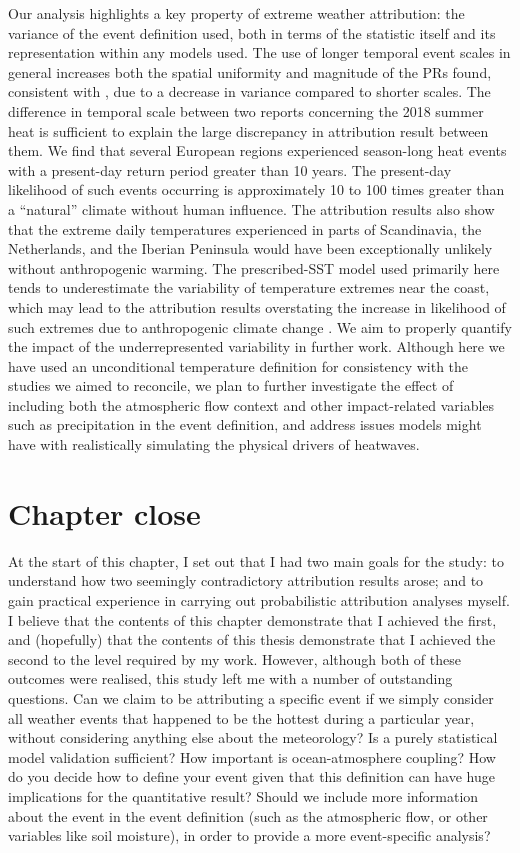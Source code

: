   Our analysis highlights a key property of extreme weather attribution: the variance of the event definition used, both in terms of the statistic itself and its representation within any models used. The use of longer temporal event scales in general increases both the spatial uniformity and magnitude of the PRs found, consistent with \citet{kirchmeieryoung_importance_2019}, due to a decrease in variance compared to shorter scales. The difference in temporal scale between two reports concerning the 2018 summer heat is sufficient to explain the large discrepancy in attribution result between them. We find that several European regions experienced season-long heat events with a present-day return period greater than 10 years. The present-day likelihood of such events occurring is approximately 10 to 100 times greater than a ``natural'' climate without human influence. The attribution results also show that the extreme daily temperatures experienced in parts of Scandinavia, the Netherlands, and the Iberian Peninsula would have been exceptionally unlikely without anthropogenic warming. The prescribed-SST model used primarily here tends to underestimate the variability of temperature extremes near the coast, which may lead to the attribution results overstating the increase in likelihood of such extremes due to anthropogenic climate change \citep{bellprat_towards_2019}. We aim to properly quantify the impact of the underrepresented variability in further work. Although here we have used an unconditional temperature definition for consistency with the studies we aimed to reconcile, we plan to further investigate the effect of including both the atmospheric flow context and other impact-related variables such as precipitation in the event definition, and address issues models might have with realistically simulating the physical drivers of heatwaves.

\section{Chapter close}\label{ch2:close}

  At the start of this chapter, I set out that I had two main goals for the study: to understand how two seemingly contradictory attribution results arose; and to gain practical experience in carrying out probabilistic attribution analyses myself. I believe that the contents of this chapter demonstrate that I achieved the first, and (hopefully) that the contents of this thesis demonstrate that I achieved the second to the level required by my work. However, although both of these outcomes were realised, this study left me with a number of outstanding questions. Can we claim to be attributing a specific event if we simply consider all weather events that happened to be the hottest during a particular year, without considering anything else about the meteorology? Is a purely statistical model validation sufficient? How important is ocean-atmosphere coupling? How do you decide how to define your event given that this definition can have huge implications for the quantitative result? Should we include more information about the event in the event definition (such as the atmospheric flow, or other variables like soil moisture), in order to provide a more event-specific analysis? 

